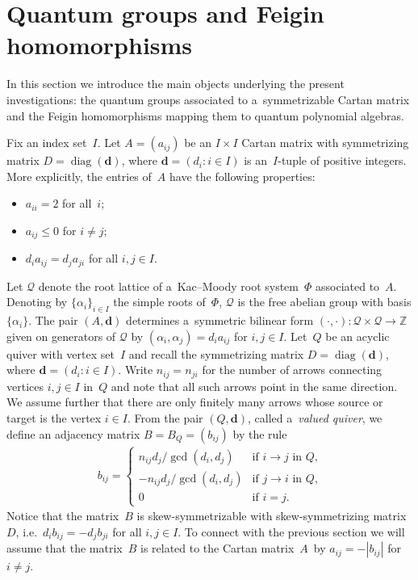 \documentclass[11pt]{article}
\numberwithin{equation}{section}
\begin{document}
\section{Quantum groups and Feigin homomorphisms}\label{sec:feigin}

In this section we introduce the main objects underlying the present investigations: the quantum groups associated to
a~symmetrizable Cartan matrix and the Feigin homomorphisms mapping them to quantum polynomial algebras.

Fix an index set~$I$.
Let $A=(a_{ij})$ be an $I\times I$ Cartan matrix with symmetrizing matrix $D=\operatorname{diag}(\mathbf{d})$, where
$\mathbf{d}=(d_i: i\in I)$ is an~$I$-tuple of positive integers.
More explicitly, the entries of~$A$ have the following properties:
\begin{itemize}\itemsep=0pt
\item $a_{ii}=2$ for all~$i$;
\item $a_{ij}\le0$ for $i\ne j$;
\item $d_ia_{ij}=d_ja_{ji}$ for all $i,j\in I$.
\end{itemize}
Let $\mathcal{Q}$ denote the root lattice of a~Kac--Moody root system~$\Phi$ associated to~$A$.
Denoting by $\{\alpha_i\}_{i\in I}$ the simple roots of~$\Phi$, $\mathcal{Q}$ is the free abelian %
group with basis $\{\alpha_i\}$.
The pair $(A,\mathbf{d})$ determines a~symmetric bilinear form $(\cdot,\cdot):\mathcal{Q}\times\mathcal{Q}\to\mathbb{Z}$
given on generators of $\mathcal{Q}$ by $(\alpha_i,\alpha_j)=d_ia_{ij}$ for $i,j\in I$.
\setcounter{section}{4}
\setcounter{subsection}{0}
\setcounter{subsubsection}{0}
\setcounter{Theorem}{0}
\setcounter{equation}{0}
Let~$Q$ be an acyclic quiver with vertex set~$I$ and recall the symmetrizing matrix $D=\operatorname{diag}(\mathbf{d})$,
where $\mathbf{d}=(d_i: i\in I)$.
Write $n_{ij}=n_{ji}$ for the number of arrows connecting vertices $i,j\in I$ in~$Q$ and note that all such arrows point in the same direction.
We assume further that there are only f\/initely many arrows whose source or target is the vertex $i\in I$.
From the pair $(Q,\mathbf{d})$, called a~\emph{valued quiver}, we def\/ine an adjacency matrix $B=B_Q=(b_{ij})$ by the rule
\begin{gather*}
b_{ij}=
\begin{cases}
n_{ij}d_j/\gcd(d_i,d_j) & \text{if $i\to j$ in~$Q$,}
\\
-n_{ij}d_j/\gcd(d_i,d_j) & \text{if $j\to i$ in~$Q$,}
\\
0 & \text{if $i=j$.}
\end{cases}
\end{gather*}
Notice that the matrix~$B$ is skew-symmetrizable with skew-symmetrizing matrix~$D$, i.e.~$d_ib_{ij}=-d_jb_{ji}$ for all $i,j\in I$.
To connect with the previous section we will assume that the matrix~$B$ is related to the Cartan matrix~$A$~by
$a_{ij}=-|b_{ij}|$ for $i\ne j$.
\setcounter{section}{4}
\setcounter{subsection}{0}
\setcounter{subsubsection}{0}
\setcounter{Theorem}{2}
\setcounter{equation}{0}
\end{document}
